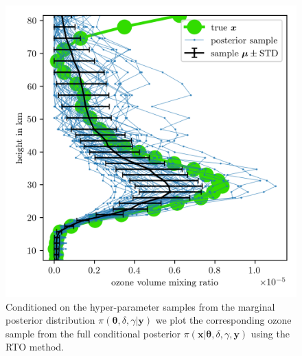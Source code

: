 \begin{figure}[ht!]
	\centering
	\includegraphics{FullO3Res.png}
	\caption[Pressure posterior samples.]{Conditioned on the hyper-parameter samples from the marginal posterior distribution $\pi(\bm{\theta} , \delta , \gamma | \bm{y})$ we plot the corresponding ozone sample from the full conditional posterior $\pi(\bm{x} | \bm{\theta},  \delta, \gamma, \bm{y})$ using the RTO method.}
	\label{fig:O3Post}
\end{figure}


\clearpage